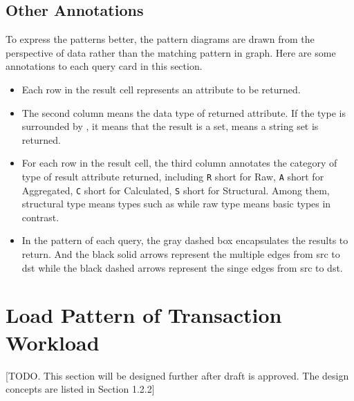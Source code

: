 
\subsection{Other Annotations}
\label{subsec:other-annotations}

To express the patterns better, the pattern diagrams are drawn from the perspective
of data rather than the matching pattern in graph. Here are some annotations to each
query card in this section.
\begin{itemize}
    \item Each row in the result cell represents an attribute to be returned.
    \item The second column means the data type of returned attribute.
          If the type is surrounded by \type{\{\}}, it means that the result is a
          set, \eg {} means a string set is returned.
    \item For each row in the result cell, the third column annotates the
          category of type of result attribute returned, including \texttt{R} short
          for Raw, \texttt{A} short for Aggregated, \texttt{C} short for Calculated,
          \texttt{S} short for Structural. Among them, structural type means types
          such as  while raw type means basic types in contrast.
   \item In the pattern of each query, the gray dashed box encapsulates the results to return. And the black solid arrows represent the multiple edges from src to dst while the black dashed arrows represent the singe edges from src to dst.
\end{itemize}


\section{Load Pattern of Transaction Workload}
 [TODO. This section will be designed further after draft is approved. The design concepts are listed in Section 1.2.2]

